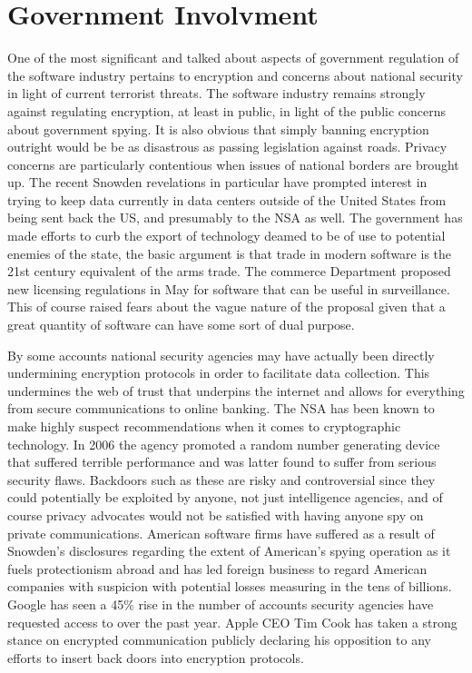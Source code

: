 \section*{Government Involvment}

One of the most significant and talked about aspects of government regulation of the software industry pertains to encryption and concerns about national security in light of current terrorist threats.\autocite[]{TerroristData}
The software industry remains strongly against regulating encryption, at least in public, in light of the public concerns about government spying.\autocite[]{TerroristData}
It is also obvious that simply banning encryption outright would be be as disastrous as passing legislation against roads.\autocite[]{TerroristData}
Privacy concerns are particularly contentious when issues of national borders are brought up. The recent Snowden revelations in particular have prompted interest in trying to keep data currently in data centers outside of the United States from being sent back the US, and presumably to the NSA as well.\autocite[]{OffMyCloud}
The government has made efforts to curb the export of technology deamed to be of use to potential enemies of the state, the basic argument is that trade in modern software is the 21st century equivalent of the arms trade.\autocite[]{HeatsUpSurveillance}
The commerce Department proposed new licensing regulations in May for software that can be useful in surveillance. This of course raised fears about the vague nature of the proposal given that a great quantity of software can have some sort of dual purpose.\autocite[]{HeatsUpSurveillance}

By some accounts national security agencies may have actually been directly undermining encryption protocols in order to facilitate data collection.\autocite[]{CrackedCredibility}
This undermines the web of trust that underpins the internet and allows for everything from secure communications to online banking.\autocite[]{CrackedCredibility}
The NSA has been known to make highly suspect recommendations when it comes to cryptographic technology. In 2006 the agency promoted a random number generating device that suffered terrible performance and was latter found to suffer from serious security flaws.\autocite[]{CrackedCredibility}
Backdoors such as these are risky and controversial since they could potentially be exploited by anyone, not just intelligence agencies, and of course privacy advocates would not be satisfied with having anyone spy on private communications.\autocite[]{CrackedCredibility}
American software firms have suffered as a result of Snowden's disclosures regarding the extent of American's spying operation as it fuels protectionism abroad and has led foreign business to regard American companies with suspicion with potential losses measuring in the tens of billions.\autocite[]{CrackedCredibility}
Google has seen a 45\% rise in the number of accounts security agencies have requested access to over the past year.\autocite[]{DataRequests}
Apple CEO Tim Cook has taken a strong stance on encrypted communication publicly declaring his opposition to any efforts to insert back doors into encryption protocols.\autocite[]{StrongEncryption}
